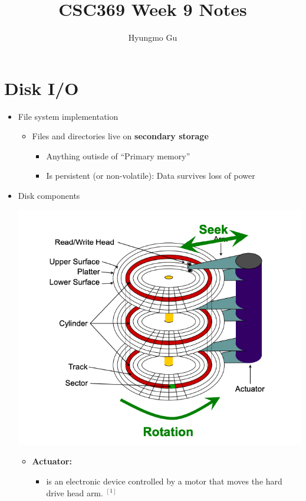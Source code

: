 \documentclass[12pt]{article}
\begin{document}
\title{CSC369 Week 9 Notes}
\author{Hyungmo Gu}
\maketitle

\section{Disk I/O}

\begin{itemize}
    \item File system implementation
    \begin{itemize}
        \item Files and directories live on \textbf{secondary storage}
        \begin{itemize}
            \item Anything outisde of ``Primary memory''
            \item Is persistent (or non-volatile): Data survives loss of power
        \end{itemize}
    \end{itemize}
    \item Disk components

    \begin{center}
        \includegraphics[width=0.6\linewidth]{images/week_9_notes_1_1.png}
    \end{center}

    \begin{itemize}
        \item \textbf{Actuator:}
        \begin{itemize}
            \item is an electronic device controlled by a motor that moves the
            hard drive head arm. $^{[1]}$
        \end{itemize}


\end{itemize}
\end{itemize}
\end{document}
